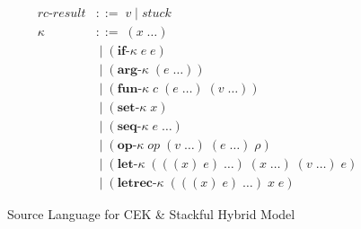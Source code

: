 \begin{figure}[!h]
\begin{align*}
        \mathit{rc\text{-}result} &::=\; v \;|\; \mathit{stuck}\\[0.3em]
        \kappa &::=\; (x\;\ldots)\\
               &\;|\; (\textbf{if-}\kappa\; e\; e)\\
               &\;|\; (\textbf{arg-}\kappa\; (e\;\ldots))\\
               &\;|\; (\textbf{fun-}\kappa\; c\; (e\;\ldots)\; (v\;\ldots))\\
               &\;|\; (\textbf{set-}\kappa\; x)\\
               &\;|\; (\textbf{seq-}\kappa\; e\;\ldots)\\
               &\;|\; (\textbf{op-}\kappa\; \textit{op}\; (v\;\ldots)\; (e\;\ldots)\; \rho)\\
               &\;|\; (\textbf{let-}\kappa\; (((x)\; e)\;\ldots)\; (x\;\ldots)\; (v\;\ldots)\; e)\\
               &\;|\; (\textbf{letrec-}\kappa\; (((x)\; e)\;\ldots)\; x\; e)
    \end{align*}

    \vspace{-1em}

    \caption{Source Language for CEK \& Stackful Hybrid Model}
    \label{fig:st-cek-grammar}
\end{figure}